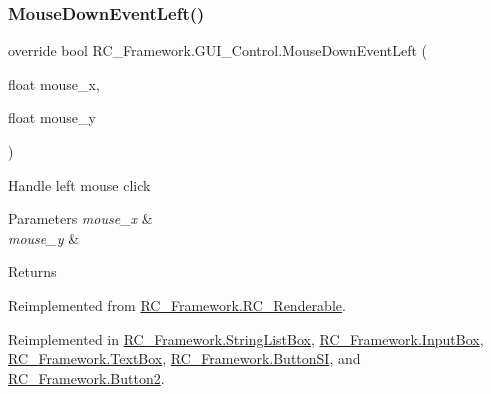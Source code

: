 \subsubsection{\texorpdfstring{Mouse\+Down\+Event\+Left()}{MouseDownEventLeft()}}
{\footnotesize\ttfamily override bool R\+C\+\_\+\+Framework.\+G\+U\+I\+\_\+\+Control.\+Mouse\+Down\+Event\+Left (\begin{DoxyParamCaption}\item[{float}]{mouse\+\_\+x,  }\item[{float}]{mouse\+\_\+y }\end{DoxyParamCaption})\hspace{0.3cm}{\ttfamily [virtual]}}



Handle left mouse click 


\begin{DoxyParams}{Parameters}
{\em mouse\+\_\+x} & \\
\hline
{\em mouse\+\_\+y} & \\
\hline
\end{DoxyParams}
\begin{DoxyReturn}{Returns}

\end{DoxyReturn}


Reimplemented from \mbox{\hyperlink{class_r_c___framework_1_1_r_c___renderable_a41d144d6fad27f219d861e61a2d9796e}{R\+C\+\_\+\+Framework.\+R\+C\+\_\+\+Renderable}}.



Reimplemented in \mbox{\hyperlink{class_r_c___framework_1_1_string_list_box_aabe8c72a90d47c67eb162c76b1e7f79c}{R\+C\+\_\+\+Framework.\+String\+List\+Box}}, \mbox{\hyperlink{class_r_c___framework_1_1_input_box_a7e57c860483df9645d726d6adbbc6dab}{R\+C\+\_\+\+Framework.\+Input\+Box}}, \mbox{\hyperlink{class_r_c___framework_1_1_text_box_a73f9a94392ff9bf3639a37a29470fb63}{R\+C\+\_\+\+Framework.\+Text\+Box}}, \mbox{\hyperlink{class_r_c___framework_1_1_button_s_i_a4323f8436749655b240fa35caa15daa6}{R\+C\+\_\+\+Framework.\+Button\+SI}}, and \mbox{\hyperlink{class_r_c___framework_1_1_button2_ac15728fbc9e908a70990c159ecd5824f}{R\+C\+\_\+\+Framework.\+Button2}}.

\mbox{\label{class_r_c___framework_1_1_g_u_i___control_ad5f72ceb3149305ce0a2891feff951a0}} 
